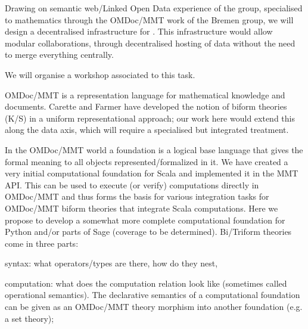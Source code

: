 \begin{workpackage}[id=dksbases,wphases=1-48!.5,
  title=Data/Knowledge/Software-Bases,lead=JU,
  ZHRM=12,JURM=36,USHRM=12,UWRM=25,SARM=10,LLRM=2,PSRM=4]
\begin{tasklist}
\begin{task}[id=data-design,lead=JU,partners={ZH,US,SA,UW,LL},
  title={Formulation of requirements and design of new  infrastructure when appropriate}]
  Drawing on semantic web/Linked Open Data experience of the  group, specialised to
  mathematics through the OMDoc/MMT work of the Bremen group, we will design a
  decentralised infrastructure for \TheProject. This infrastructure would allow modular
  collaborations, through decentralised hosting of data without the need to merge
  everything centrally.

 We will organise a workshop associated to this task.
\end{task}

\begin{task}[title=Triform Theories in OMDoc/MMT,id=data-triform,
  lead=JU,partners={ZH}]
OMDoc/MMT is a representation language for mathematical knowledge and documents. Carette and Farmer have developed the notion of biform theories (K/S) in a uniform representational approach; our work here would extend this along the data axis, which will require a specialised but integrated treatment.
\end{task}

\begin{task}[title=Computational Foundation for Python/Sage (or some CAS),
  id=data-foundationCAS,lead=JU,partners={ZH,SA}]
In the OMDoc/MMT world a foundation is a logical base language that gives the formal meaning to all objects represented/formalized in it. We have created a very initial computational foundation for Scala and implemented it in the MMT API. This can be used to execute (or verify) computations directly in OMDoc/MMT and thus forms the basis for various integration tasks for OMDoc/MMT biform theories that integrate Scala computations. Here we propose to develop a somewhat more complete computational foundation for Python and/or parts of Sage (coverage to be determined). Bi/Triform theories come in three parts:
\begin{compactitem}
\item syntax: what operators/types are there, how do they nest, 
\item computation:  what does the computation relation look like (sometimes called operational semantics). The declarative semantics of a computational foundation can be given as an OMDoc/MMT theory morphism into another foundation (e.g. a set theory);
\item {}
\end{compactitem}
\end{task}


\end{tasklist}
\end{workpackage}
